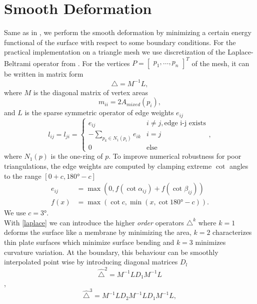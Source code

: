 \documentclass[twocolumn]{article}
\begin{document}
\section{Smooth Deformation}
Same as in \cite{botsch2004intuitive}, we perform the smooth deformation by minimizing a certain energy functional of the surface with respect to some boundary conditions. For the practical implementation on a triangle mesh we use discretization of the Laplace-Beltrami operator from \cite{meyer2003discrete}. For the vertices $P = \begin{bmatrix}p_1,\dots, p_n\end{bmatrix}^T$ of the mesh, it can be written in matrix form
\begin{equation}\label{laplace}
\triangle = M^{-1} L,
\end{equation}
where $M$ is the diagonal matrix of vertex areas 
\begin{equation*}
m_{ii} = 2 A_{mixed}(p_i),
\end{equation*} and $L$ is the sparse symmetric operator of edge weights $e_{ij}$
\begin{equation*}
l_{ij} = l_{ji} = \begin{cases} e_{ij} & i \neq j, \text{edge i-j exists} \\ -\sum_{p_k \in N_1(p_i)} e_{ik} & i=j \\ 0 & \text{else}  \end{cases},
\end{equation*}
where $N_1(p)$ is the one-ring of $p$. To improve numerical robustness for poor triangulations, the edge weights are computed by clamping extreme $\cot$ angles to the range $[0+c,\ang{180}-c]$
\begin{align*}
e_{ij} &= \max(0, f(\cot \alpha_{ij}) + f(\cot \beta_{ij})) \\
f(x) &= \max(\cot c, \min(x, \cot \ang{180}-c)).
\end{align*}
We use $c = \ang{3}$.\\
With \eqref{laplace} we can introduce the higher \textit{order} operators $\triangle^k$ where $k=1$ deforms the surface like a membrane by minimizing the area, $k=2$ characterizes thin plate surfaces which minimize
surface bending and $k=3$ minimizes curvature variation. At the boundary, this behaviour can be smoothly interpolated point wise by introducing diagonal matrices $D_l$ 
\begin{equation}\label{laplace2}
\hat{\triangle}^2 = M^{-1} L D_1 M^{-1} L
\end{equation} ,
\begin{equation}\label{laplace3}
\hat{\triangle}^3 = M^{-1}LD_2 M^{-1} L D_1 M^{-1} L,
\end{equation}
\end{document}
